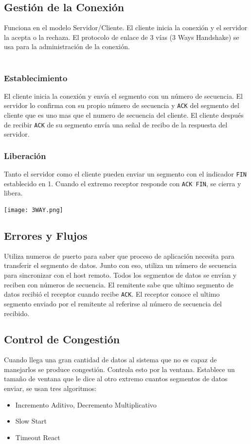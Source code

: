 \subsection*{Gestión de la Conexión}
Funciona en el modelo Servidor/Cliente. El cliente inicia la conexión y el servidor la acepta o la rechaza. El protocolo de enlace de 3 vías (3 Ways Handshake) se usa para la administración de la conexión.\\${ }$\\
\noindent
\begin{minipage}[t]{.5\textwidth}
\raggedright
\subsubsection*{Establecimiento}
El cliente inicia la conexión y envía el segmento con un número de secuencia. El servidor lo confirma con su propio número de secuencia y \texttt{ACK} del segmento del cliente que es uno mas que el numero de secuencia del cliente. El cliente después de recibir \texttt{ACK} de su segmento envía una señal de recibo de la respuesta del servidor.
\subsubsection*{Liberación}
Tanto el servidor como el cliente pueden enviar un segmento con el indicador \texttt{FIN} establecido en 1. Cuando el extremo receptor responde con \texttt{ACK FIN}, se cierra y libera.
\end{minipage}%
\begin{minipage}[t]{.5\textwidth}
\noindent
\raggedleft
\begin{center}
\texttt{[image: 3WAY.png]}
\end{center}
\end{minipage}
\subsection*{Errores y Flujos}
Utiliza numeros de puerto para saber que proceso de aplicación necesita para transferir el segmento de datos. Junto con eso, utiliza un número de secuencia para sincronizar con el host remoto. Todos los segmentos de datos se envían y reciben con números de secuencia. El remitente sabe que ultimo segmento de datos recibió el receptor cuando recibe \texttt{ACK}. El receptor conoce el ultimo segmento enviado por el remitente al referirse al número de secuencia del recibido.
\subsection*{Control de Congestión}
Cuando llega una gran cantidad de datos al sistema que no es capaz de manejarlos se produce congestión. Controla esto por la ventana. Establece un tamaño de ventana que le dice al otro extremo cuantos segmentos de datos enviar, se usan tres algoritmos:
\begin{itemize}
\item Incremento Aditivo, Decremento Multiplicativo\
\item Slow Start
\item Timeout React
\end{itemize}